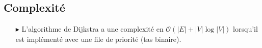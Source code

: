 \documentclass{report}
\begin{document}
\begin{multicols*}{2}
\subsection*{Complexité}

\begin{itemize}
    \item[\( \blacktriangleright \)] L'algorithme de Dijkstra a une complexité en \( \mathcal{O}( |E| + |V| \log |V| ) \) lorsqu'il est implémenté avec une file de priorité (tas binaire).
\end{itemize}
\end{multicols*}
\end{document}
